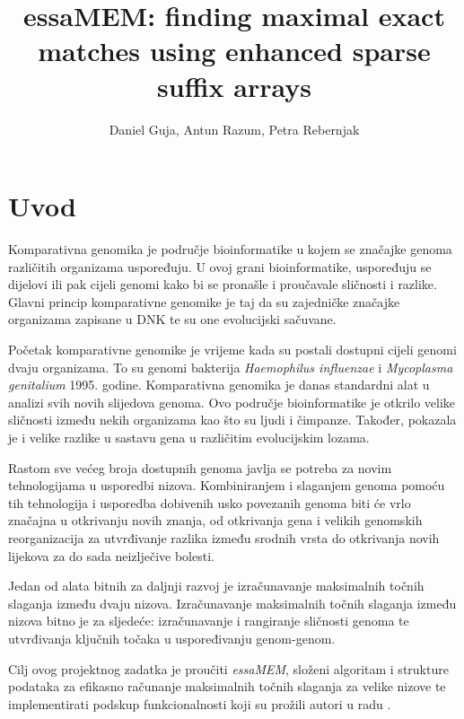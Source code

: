 \documentclass[times, utf8, seminar, numeric]{fer}
\begin{document}
\title{essaMEM: finding maximal exact matches using enhanced sparse suffix arrays}
\author{Daniel Guja, Antun Razum, Petra Rebernjak}

\maketitle
\tableofcontents

\chapter{Uvod}
Komparativna genomika je područje bioinformatike u kojem se značajke genoma različitih organizama uspoređuju. U ovoj grani bioinformatike, uspoređuju se dijelovi ili pak cijeli genomi kako bi se pronašle i proučavale sličnosti i razlike. Glavni princip komparativne genomike je taj da su zajedničke značajke organizama zapisane u DNK te su one evolucijski sačuvane.

Početak komparativne genomike je vrijeme kada su postali dostupni cijeli genomi dvaju organizama. To su genomi bakterija \textit{Haemophilus influenzae} i \textit{Mycoplasma genitalium} 1995. godine. Komparativna genomika je danas standardni alat u analizi svih novih slijedova genoma. Ovo područje bioinformatike je otkrilo velike sličnosti između nekih organizama kao što su ljudi i čimpanze. Također, pokazala je i velike razlike u sastavu gena u različitim evolucijskim lozama.

Rastom sve većeg broja dostupnih genoma javlja se potreba za novim tehnologijama u usporedbi nizova. Kombiniranjem i slaganjem genoma pomoću tih tehnologija i usporedba dobivenih usko povezanih genoma biti će vrlo značajna u otkrivanju novih znanja, od otkrivanja gena i velikih genomskih reorganizacija za utvrđivanje razlika između srodnih vrsta do otkrivanja novih lijekova za do sada neizlječive bolesti.

Jedan od alata bitnih za daljnji razvoj je izračunavanje maksimalnih točnih slaganja između dvaju nizova. Izračunavanje maksimalnih točnih slaganja između nizova bitno je za sljedeće: izračunavanje i rangiranje sličnosti genoma te utvrđivanja ključnih točaka u uspoređivanju genom-genom.

Cilj ovog projektnog zadatka je proučiti \textit{essaMEM}, složeni algoritam i strukture podataka za efikasno računanje maksimalnih točnih slaganja za velike nizove te implementirati podskup funkcionalnosti koji su prožili autori u radu \cite{essa}.
\end{document}
